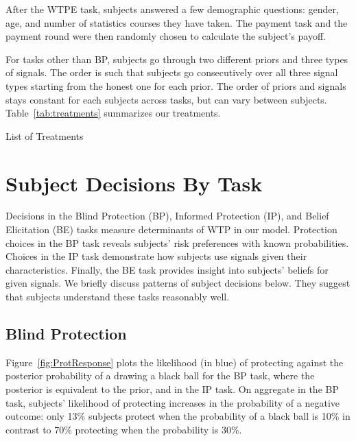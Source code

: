 \documentclass[12pt,a4paper]{article}
\begin{document}
\vspace{10pt} 

After the WTPE task, subjects answered a few demographic questions: gender, age, and number of statistics courses they have taken. The payment task and the payment round were then randomly chosen to calculate the subject's payoff. 

For tasks other than BP, subjects go through two different priors and three types of signals. The order is such that subjects go consecutively over all three signal types starting from the honest one for each prior. The order of priors and signals stays constant for each subjects across tasks, but can vary between subjects. Table~\ref{tab:treatments} summarizes our treatments.

\begin{table}[h!]
\caption{List of Treatments} \label{tab:treatments}

\end{table}


 


\vspace{20pt}
\section{Subject Decisions By Task}\label{sec:sanity}

Decisions in the Blind Protection (BP), Informed Protection (IP), and Belief Elicitation (BE) tasks measure determinants of WTP in our model. Protection choices in the BP task reveals subjects' risk preferences with known probabilities. Choices in the IP task demonstrate how subjects use signals given their characteristics. Finally, the BE task provides insight into subjects' beliefs for given signals.  We briefly discuss patterns of subject decisions below. They suggest that subjects understand these tasks reasonably well.

\subsection{Blind Protection}

Figure~\ref{fig:ProtResponse} plots the likelihood (in blue) of protecting against the posterior probability of a drawing a black ball for the BP task, where the posterior is equivalent to the prior, and in the IP task. On aggregate in the BP task, subjects' likelihood of protecting increases in the probability of a negative outcome: only 13\% subjects protect when the probability of a black ball is 10\% in contrast to 70\% protecting when the probability is 30\%. 
\end{document}
